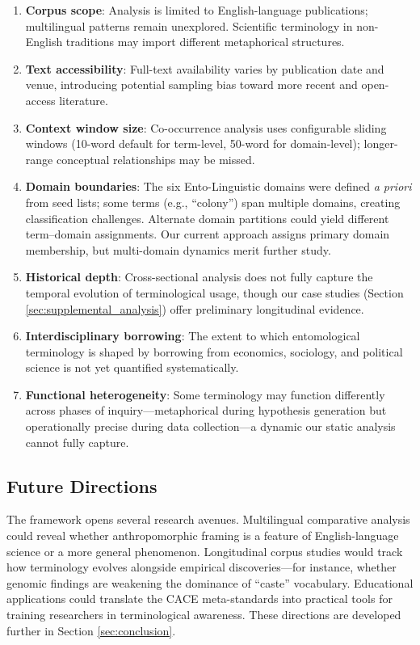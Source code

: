 \documentclass[
]{article}
\providecommand{\tightlist}{%
  \setlength{\itemsep}{0pt}\setlength{\parskip}{0pt}}
\numberwithin{equation}{section}
\begin{document}
\begin{enumerate}
\def\labelenumi{\arabic{enumi}.}
\tightlist
\item
  \textbf{Corpus scope}: Analysis is limited to English-language
  publications; multilingual patterns remain unexplored. Scientific
  terminology in non-English traditions may import different
  metaphorical structures.
\item
  \textbf{Text accessibility}: Full-text availability varies by
  publication date and venue, introducing potential sampling bias toward
  more recent and open-access literature.
\item
  \textbf{Context window size}: Co-occurrence analysis uses configurable
  sliding windows (10-word default for term-level, 50-word for
  domain-level); longer-range conceptual relationships may be missed.
\item
  \textbf{Domain boundaries}: The six Ento-Linguistic domains were
  defined \emph{a priori} from seed lists; some terms (e.g., ``colony'')
  span multiple domains, creating classification challenges. Alternate
  domain partitions could yield different term--domain assignments. Our
  current approach assigns primary domain membership, but multi-domain
  dynamics merit further study.
\item
  \textbf{Historical depth}: Cross-sectional analysis does not fully
  capture the temporal evolution of terminological usage, though our
  case studies (Section \ref{sec:supplemental_analysis}) offer
  preliminary longitudinal evidence.
\item
  \textbf{Interdisciplinary borrowing}: The extent to which
  entomological terminology is shaped by borrowing from economics,
  sociology, and political science is not yet quantified systematically.
\item
  \textbf{Functional heterogeneity}: Some terminology may function
  differently across phases of inquiry---metaphorical during hypothesis
  generation but operationally precise during data collection---a
  dynamic our static analysis cannot fully capture.
\end{enumerate}

\subsection{Future Directions}\label{future-directions}

The framework opens several research avenues. Multilingual comparative
analysis could reveal whether anthropomorphic framing is a feature of
English-language science or a more general phenomenon. Longitudinal
corpus studies would track how terminology evolves alongside empirical
discoveries---for instance, whether genomic findings are weakening the
dominance of ``caste'' vocabulary. Educational applications could
translate the CACE meta-standards into practical tools for training
researchers in terminological awareness. These directions are developed
further in Section \ref{sec:conclusion}.
\end{document}
